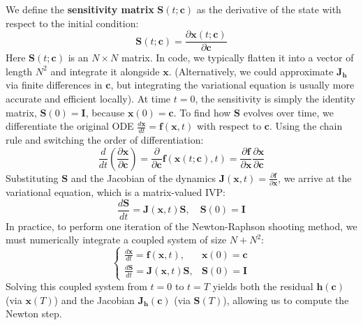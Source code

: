 We define the \textbf{sensitivity matrix} $\mathbf{S}(t; \mathbf{c})$ as the derivative of the state with respect to the initial condition:
\begin{equation}
    \mathbf{S}(t; \mathbf{c}) = \frac{\partial \mathbf{x}(t; \mathbf{c})}{\partial \mathbf{c}}
\end{equation}
Here $\mathbf{S}(t; \mathbf{c})$ is an $N \times N$ matrix. In code, we typically flatten it into a vector of length $N^2$ and integrate it alongside $\mathbf{x}$. (Alternatively, we could approximate $\mathbf{J}_{\mathbf{h}}$ via finite differences in $\mathbf{c}$, but integrating the variational equation is usually more accurate and efficient locally).
At time $t=0$, the sensitivity is simply the identity matrix, $\mathbf{S}(0) = \mathbf{I}$, because $\mathbf{x}(0) = \mathbf{c}$. To find how $\mathbf{S}$ evolves over time, we differentiate the original ODE $\frac{d\mathbf{x}}{dt} = \mathbf{f}(\mathbf{x}, t)$ with respect to $\mathbf{c}$. Using the chain rule and switching the order of differentiation:
\begin{equation}
    \frac{d}{dt} \left( \frac{\partial \mathbf{x}}{\partial \mathbf{c}} \right) = \frac{\partial}{\partial \mathbf{c}} \mathbf{f}(\mathbf{x}(t; \mathbf{c}), t) = \frac{\partial \mathbf{f}}{\partial \mathbf{x}} \frac{\partial \mathbf{x}}{\partial \mathbf{c}}
\end{equation}
Substituting $\mathbf{S}$ and the Jacobian of the dynamics $\mathbf{J}(\mathbf{x}, t) = \frac{\partial \mathbf{f}}{\partial \mathbf{x}}$, we arrive at the variational equation, which is a matrix-valued IVP:
\begin{equation}
    \frac{d\mathbf{S}}{dt} = \mathbf{J}(\mathbf{x}, t) \mathbf{S}, \quad \mathbf{S}(0) = \mathbf{I}
\end{equation}
In practice, to perform one iteration of the Newton-Raphson shooting method, we must numerically integrate a coupled system of size $N + N^2$:
\begin{equation}
    \begin{cases}
        \frac{d\mathbf{x}}{dt} = \mathbf{f}(\mathbf{x}, t), & \mathbf{x}(0) = \mathbf{c} \\
        \frac{d\mathbf{S}}{dt} = \mathbf{J}(\mathbf{x}, t)\mathbf{S}, & \mathbf{S}(0) = \mathbf{I}
    \end{cases}
\end{equation}
Solving this coupled system from $t=0$ to $t=T$ yields both the residual $\mathbf{h}(\mathbf{c})$ (via $\mathbf{x}(T)$) and the Jacobian $\mathbf{J}_{\mathbf{h}}(\mathbf{c})$ (via $\mathbf{S}(T)$), allowing us to compute the Newton step.

